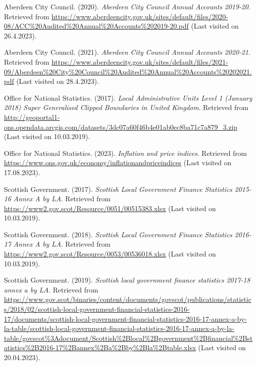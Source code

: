 \documentclass[
  12pt,
]{article}
\newlength{\cslhangindent}
\newlength{\cslentryspacingunit} %
\newenvironment{CSLReferences}[2] %
 {%
  \setlength{\parindent}{0pt}
  \ifodd #1
  \let\oldpar\par
  \def\par{\hangindent=\cslhangindent\oldpar}
  \fi
  \setlength{\parskip}{#2\cslentryspacingunit}
 }%
 {}
\begin{document}
\hypertarget{refs}{}
\begin{CSLReferences}{1}{0}
\leavevmode{}%
Aberdeen City Council. (2020). \emph{{Aberdeen City Council Annual Accounts 2019-20}}. Retrieved from \url{https://www.aberdeencity.gov.uk/sites/default/files/2020-08/ACC\%20Audited\%20Annual\%20Accounts\%202019-20.pdf} (Last visited on 26.4.2023).

\leavevmode{}%
Aberdeen City Council. (2021). \emph{{Aberdeen City Council Annual Accounts 2020-21}}. Retrieved from \url{https://www.aberdeencity.gov.uk/sites/default/files/2021-09/Aberdeen\%20City\%20Council\%20Audited\%20Annual\%20Accounts\%20202021.pdf} (Last visited on 28.4.2023).

\leavevmode{}%
Office for National Statistics. (2017). \emph{{Local Administrative Units Level 1 (January 2018) Super Generalised Clipped Boundaries in United Kingdom}}. Retrieved from \url{http://geoportal1-ons.opendata.arcgis.com/datasets/3dc07a60f46b4e01ab0ec8ba71c7a879_3.zip} (Last visited on 10.03.2019).

\leavevmode{}%
Office for National Statistics. (2023). \emph{{Inflation and price indices}}. Retrieved from \url{https://www.ons.gov.uk/economy/inflationandpriceindices} (Last visited on 17.08.2023).

\leavevmode{}%
Scottish Government. (2017). \emph{{Scottish Local Government Finance Statistics 2015-16 Annex A by LA}}. Retrieved from \url{https://www2.gov.scot/Resource/0051/00515383.xlsx} (Last visited on 10.03.2019).

\leavevmode{}%
Scottish Government. (2018). \emph{{Scottish Local Government Finance Statistics 2016-17 Annex A by LA}}. Retrieved from \url{https://www2.gov.scot/Resource/0053/00536018.xlsx} (Last visited on 10.03.2019).

\leavevmode{}%
Scottish Government. (2019). \emph{Scottish local government finance statistics 2017-18 annex a by LA}. Retrieved from \url{https://www.gov.scot/binaries/content/documents/govscot/publications/statistics/2018/02/scottish-local-government-financial-statistics-2016-17/documents/scottish-local-government-financial-statistics-2016-17-annex-a-by-la-table/scottish-local-government-financial-statistics-2016-17-annex-a-by-la-table/govscot\%3Adocument/Scottish\%2Blocal\%2Bgovernment\%2Bfinancial\%2Bstatistics\%2B2016-17\%2Bannex\%2Ba\%2Bby\%2Bla\%2Btable.xlsx} (Last visited on 20.04.2023).


\end{CSLReferences}
\end{document}
